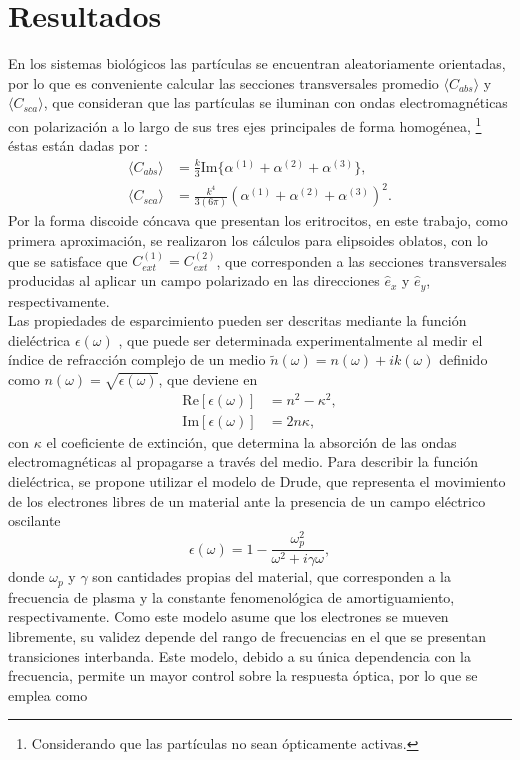\section{Resultados}
En los sistemas biológicos las partículas se encuentran aleatoriamente orientadas, por lo que es conveniente calcular las secciones transversales promedio $\langle C_{abs}\rangle$ y $\langle C_{sca}\rangle$, que consideran que las partículas se iluminan con ondas electromagnéticas con polarización a lo largo de sus tres ejes principales de forma homogénea, \footnote{Considerando que las partículas no sean ópticamente activas.} éstas están dadas por \cite{Bohren}:
\begin{align*}
	\langle C_{abs}\rangle &= \frac{k}{3} \text{Im}\{\alpha^{(1)}+\alpha^{(2)}+\alpha^{(3)}\},\\
	\langle C_{sca}\rangle &= \frac{k^4}{3(6\pi)} \left(\alpha^{(1)}+\alpha^{(2)}+\alpha^{(3)}\right)^2.
\end{align*}
Por la forma discoide cóncava que presentan los eritrocitos, en este trabajo, como primera aproximación, se realizaron los cálculos para elipsoides oblatos, con lo que se satisface que $C_{ext}^{(1)}=C_{ext}^{(2)}$, que corresponden a las secciones transversales producidas al aplicar un campo  polarizado en las direcciones $\hat{e}_x$ y $\hat{e}_y$, respectivamente. \\

Las propiedades de esparcimiento pueden ser descritas mediante la función dieléctrica $\epsilon(\omega)$ \cite{Plasmonics}, que puede ser determinada experimentalmente al medir el índice de refracción complejo de un medio $\tilde{n}(\omega)=n(\omega)+ik(\omega)$ definido como $n(\omega)=\sqrt{\epsilon(\omega)}$, que deviene en \cite{Plasmonics}
\begin{align}
	\text{Re}[\epsilon(\omega)]&=n^2-\kappa^2,\\
	\text{Im}[\epsilon(\omega)]&=2n\kappa,
\end{align}
con $\kappa$ el coeficiente de extinción, que determina la absorción de las ondas electromagnéticas al propagarse a través del medio. Para describir la función dieléctrica, se propone utilizar el modelo de Drude, que representa el movimiento de los electrones libres de un material ante la presencia de un campo eléctrico oscilante \cite{Plasmonics}
\begin{equation}
	\epsilon(\omega)=1-\frac{\omega_p^2}{\omega^2+i\gamma\omega},
\end{equation}
donde $\omega_p$ y $\gamma$ son cantidades propias del material, que corresponden a la frecuencia de plasma y la constante fenomenológica de amortiguamiento, respectivamente. Como este modelo asume que los electrones se mueven libremente, su validez depende del rango de frecuencias en el que se presentan transiciones interbanda. Este modelo, debido a su única dependencia con la frecuencia, permite un mayor control sobre la respuesta óptica, por lo que se emplea como  \\

